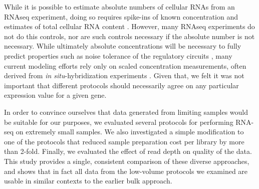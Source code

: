 While it is possible to estimate absolute numbers of cellular RNAs from an RNAseq experiment, doing so requires spike-ins of known concentration and estimates of total cellular RNA content \cite{Mortazavi:2008jj}. However, many RNAseq experiments do not do this controls, nor are such controls necessary if the absolute number is not necessary. While ultimately absolute concentrations will be necessary to fully predict properties such as noise tolerance of the regulatory circuits \cite{Gregor:2007du,Gregor:2005jn}, many current modeling efforts rely only on scaled concentration measurements, often derived from {\em in situ}-hybridization experiments \cite{Garcia:2013fs,Ilsley:2013fk,He:2010ix}.  Given that, we felt it was not important that different protocols should necessarily agree on any particular expression value for a given gene.

In order to convince ourselves that data generated from limiting samples would be suitable for our purposes, we evaluated several protocols for performing RNA-seq on extremely small samples.  We also investigated a simple modification to one of the protocols that reduced sample preparation cost per library by more than 2-fold.  Finally, we evaluated the effect of read depth on quality of the data.  This study provides a single, consistent comparison of these diverse approaches, and shows that in fact all data from the low-volume protocols we examined are usable in similar contexts to the earlier bulk approach.
